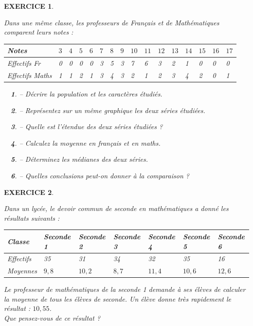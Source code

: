 \documentclass[a4paper]{article}   %
\renewcommand{\(}{\left(}
\renewcommand{\)}{\right)}
\newtheorem{ques}{~}
\newenvironment{qu}{\begin{ques}--} {\end{ques}}
\newtheorem{EXO}{\large EXERCICE }
\newenvironment{EX}   { \setcounter{ques}{0} \begin{EXO} \hrulefill ~\vspace{0.3cm}

\normalfont}    {\end{EXO} \medskip}
\begin{document}
\setcounter{ques}{0}
\begin{EX} Dans une même classe, les professeurs de Français et de Mathématiques comparent leurs notes :
\begin{center}
\begin{tabular}{|p{3cm}|p{0.5cm}| p{0.5cm}|p{0.5cm}|p{0.5cm}|p{0.5cm}|p{0.5cm}|p{0.5cm}|p{0.5cm}|p{0.5cm}|p{0.5cm}|p{0.5cm}|p{0.5cm}|p{0.5cm}|p{0.5cm}|p{0.5cm}|}		%
\hline							%
Notes & $3$&$4$&$5$&$6$&$7$&$8$&$9$&$10$&$11$&$12$&$13$&$14$&$15$&$16$&$17$ \\
\hline
Effectifs Fr&0&0&0&0&3&5&3&7&6&3&2&1&0&0&0\\
\hline
Effectifs Maths&1&1&2&1&3&4&3&2&1&2&3&4&2&0&1\\
\hline
\end{tabular}
\end{center}
\begin{qu} Décrire la population et les caractères étudiés.
\end{qu}
\begin{qu} Représentez sur un même graphique les deux séries étudiées.
\end{qu}
\begin{qu} Quelle est l'étendue des deux séries étudiées ?
\end{qu}
\begin{qu} Calculez la moyenne en français et en maths.
\end{qu}
\begin{qu} Déterminez les médianes des deux séries.
\end{qu}
\begin{qu} Quelles conclusions peut-on donner à la comparaison ?
\end{qu}
\end{EX}

\begin{EX} Dans un lycée, le devoir commun de seconde en mathématiques a donné les résultats suivants :
\begin{center}
\begin{tabular}{|p{3.5cm}| p{2cm}|p{2cm}|p{2cm}|p{2cm}|p{2cm}|p{2cm}|}		
\hline							%
Classe & Seconde 1&Seconde 2&Seconde 3&Seconde 4&Seconde 5&Seconde 6 \\
\hline
Effectifs&35&31&34&32&35&16\\
\hline
Moyennes &$9,8$&$10,2$&$8,7$&$11,4$&$10,6$&$12,6$\\
\hline
\end{tabular}
\end{center}
Le professeur de mathématiques de la seconde 1 demande à ses élèves de calculer la moyenne de tous les élèves de seconde. Un élève donne très rapidement le résultat : $10,55$. \\

Que pensez-vous de ce résultat ?
\end{EX}
\end{document}
